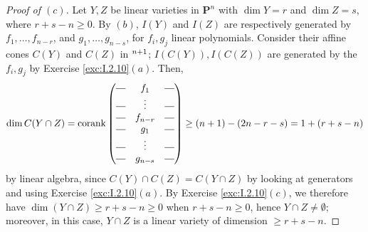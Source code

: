 \documentclass[10pt]{article}
\theoremstyle{definition}
\theoremstyle{remark}
\numberwithin{equation}{section}
\numberwithin{figure}{subsubsection}
\let\AA\relax
\DeclareMathOperator{\AA}{\mathbf{A}}
\newcommand{\PP}{\mathbf{P}}
\begin{document}
\begin{proof}[Proof of $(c)$]
  Let $Y,Z$ be linear varieties in $\PP^n$ with $\dim Y = r$ and $\dim Z = s$,
  where $r+s-n \ge 0$. By $(b)$, $I(Y)$ and $I(Z)$ are respectively generated by
  $f_1,\ldots,f_{n-r}$, and $g_1,\ldots,g_{n-s}$, for $f_i,g_j$ linear polynomials.
  Consider their affine cones $C(Y)$ and $C(Z)$ in
  $\AA^{n+1}$; $I(C(Y)),I(C(Z))$ are generated by the $f_i,g_j$ by
  Exercise \ref{exc:I.2.10}$(a)$. Then,
  \begin{equation*}
    \dim C(Y \cap Z) = \operatorname{corank} \begin{pmatrix}
      \rule[.5ex]{1em}{0.4pt} & f_1     & \rule[.5ex]{1em}{0.4pt}\\
      \rule[.5ex]{1em}{0.4pt} & \vdots  & \rule[.5ex]{1em}{0.4pt}\\
      \rule[.5ex]{1em}{0.4pt} & f_{n-r} & \rule[.5ex]{1em}{0.4pt}\\
      \rule[.5ex]{1em}{0.4pt} & g_1     & \rule[.5ex]{1em}{0.4pt}\\
      \rule[.5ex]{1em}{0.4pt} & \vdots  & \rule[.5ex]{1em}{0.4pt}\\
      \rule[.5ex]{1em}{0.4pt} & g_{n-s} & \rule[.5ex]{1em}{0.4pt}
    \end{pmatrix} \ge (n+1) - (2n - r - s) = 1 + (r + s - n)
  \end{equation*}
  by linear algebra, since $C(Y) \cap C(Z) = C(Y \cap Z)$ by looking at
  generators and using Exercise \ref{exc:I.2.10}$(a)$. By Exercise
  \ref{exc:I.2.10}$(c)$,
  we therefore have $\dim (Y \cap Z) \ge r + s - n \ge 0$ when $r + s - n \ge 0$,
  hence $Y \cap Z \ne \emptyset$; moreover, in this case, $Y \cap Z$ is a linear
  variety of dimension $\ge r + s - n$.

\end{proof}
\end{document}
